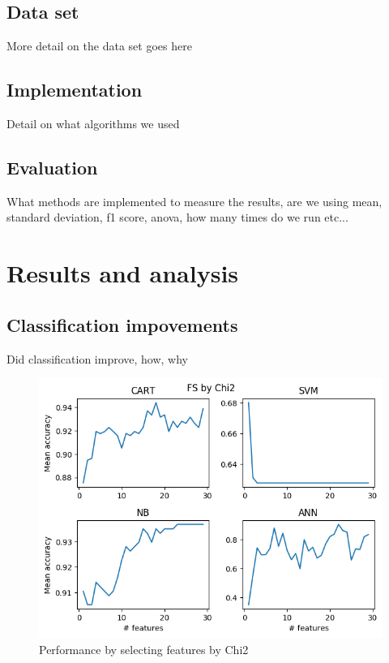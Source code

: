 \documentclass{kththesis}
\begin{document}
\section{Data set}

More detail on the data set goes here

\section{Implementation}

Detail on what algorithms we used

\section{Evaluation}

What methods are implemented to measure the results, are we using mean, standard deviation, f1 score, anova, how many times do we run etc...

\chapter{Results and analysis}

\section{Classification impovements}

Did classification improve, how, why

\begin{figure}[ht!]
  \includegraphics[width=\linewidth]{../plots/FS_by_Chi2.png}
  \caption{Performance by selecting features by Chi2}
  \label{fig:chi2}
\end{figure}
\end{document}
